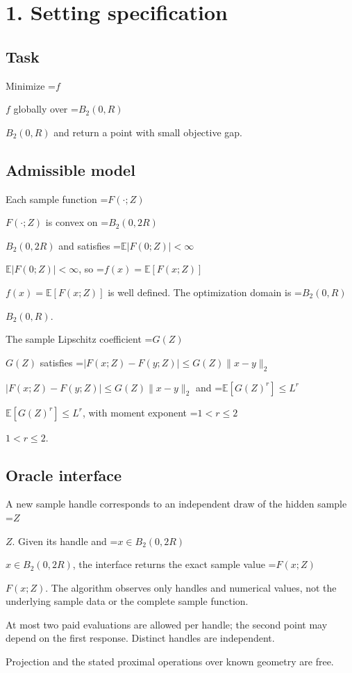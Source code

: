 \documentclass[10pt,a4paper]{article}
\newcommand{\AtlasMath}[1]{\par\begingroup\centering\setbox0=\hbox{$\displaystyle #1$}\ifdim\wd0>1.4\linewidth\typeout{ATLAS WIDE FORMULA: \the\wd0}\fi\ifdim\wd0>\linewidth\resizebox{\linewidth}{!}{\box0}\else\box0\fi\par\endgroup}
\newcommand{\AtlasInlineMath}[1]{\begingroup\setbox0=\hbox{$#1$}\ifdim\wd0>.4\linewidth\endgroup\AtlasMath{#1}\else\endgroup$#1$\fi}
\begin{document}
\section{1. Setting specification}


\subsection{Task}


Minimize \AtlasInlineMath{f} globally over \AtlasInlineMath{B_2(0,R)} and return a point with small objective gap.



\subsection{Admissible model}


Each sample function \AtlasInlineMath{F(\cdot;Z)} is convex on \AtlasInlineMath{B_2(0,2R)} and satisfies \AtlasInlineMath{\mathbb{E}|F(0;Z)|<\infty}, so \AtlasInlineMath{f(x)=\mathbb{E}[F(x;Z)]} is well defined. The optimization domain is \AtlasInlineMath{B_2(0,R)}.



The sample Lipschitz coefficient \AtlasInlineMath{G(Z)} satisfies \AtlasInlineMath{|F(x;Z)-F(y;Z)|\le G(Z)\|x-y\|_2} and \AtlasInlineMath{\mathbb{E}[G(Z)^r]\le L^r}, with moment exponent \AtlasInlineMath{1<r\le2}.



\subsection{Oracle interface}


A new sample handle corresponds to an independent draw of the hidden sample \AtlasInlineMath{Z}. Given its handle and \AtlasInlineMath{x\in B_2(0,2R)}, the interface returns the exact sample value \AtlasInlineMath{F(x;Z)}. The algorithm observes only handles and numerical values, not the underlying sample data or the complete sample function.



At most two paid evaluations are allowed per handle; the second point may depend on the first response. Distinct handles are independent.



Projection and the stated proximal operations over known geometry are free.
\end{document}

